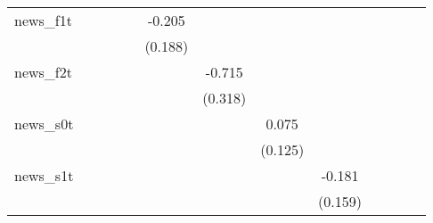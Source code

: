 {\begin{tabular}{l*{12}{c}}
\addlinespace
news\_f1t    &                     &                     &                     &                     &      -0.205         &                     &                     &                     &                     &                     &                     &                     \\
            &                     &                     &                     &                     &     (0.188)         &                     &                     &                     &                     &                     &                     &                     \\
\addlinespace
news\_f2t    &                     &                     &                     &                     &                     &      -0.715\sym{**} &                     &                     &                     &                     &                     &                     \\
            &                     &                     &                     &                     &                     &     (0.318)         &                     &                     &                     &                     &                     &                     \\
\addlinespace
news\_s0t    &                     &                     &                     &                     &                     &                     &       0.075         &                     &                     &                     &                     &                     \\
            &                     &                     &                     &                     &                     &                     &     (0.125)         &                     &                     &                     &                     &                     \\
\addlinespace
news\_s1t    &                     &                     &                     &                     &                     &                     &                     &      -0.181         &                     &                     &                     &                     \\
            &                     &                     &                     &                     &                     &                     &                     &     (0.159)         &                     &                     &                     &                     \\

\end{tabular}}
